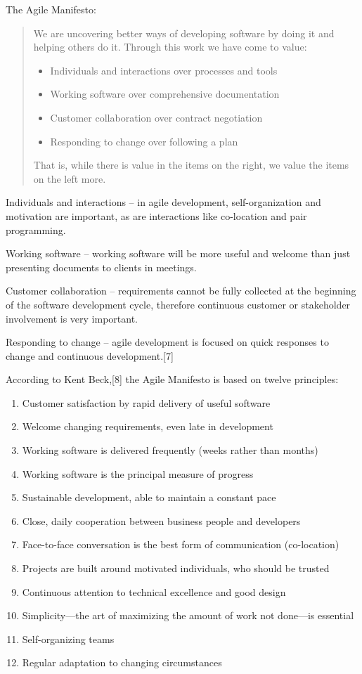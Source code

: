 The Agile Manifesto:
\begin{quotation}
\begin{small}

We are uncovering better ways of developing software by doing it and helping others do it. Through this work we have come to value:

\begin{itemize}
\item Individuals and interactions over processes and tools
\item Working software over comprehensive documentation
\item Customer collaboration over contract negotiation
\item Responding to change over following a plan
\end{itemize}

That is, while there is value in the items on the right, we value the items on the left more.
\end{small}
\end{quotation}

Individuals and interactions – in agile development, self-organization and motivation are important, as are interactions like co-location and pair programming.

Working software – working software will be more useful and welcome than just presenting documents to clients in meetings.

Customer collaboration – requirements cannot be fully collected at the beginning of the software development cycle, therefore continuous customer or stakeholder involvement is very important.

Responding to change – agile development is focused on quick responses to change and continuous development.[7]

According to Kent Beck,[8] the Agile Manifesto is based on twelve principles:
\begin{enumerate}
\item Customer satisfaction by rapid delivery of useful software
\item Welcome changing requirements, even late in development
\item Working software is delivered frequently (weeks rather than months)
\item Working software is the principal measure of progress
\item Sustainable development, able to maintain a constant pace
\item Close, daily cooperation between business people and developers
\item Face-to-face conversation is the best form of communication (co-location)
\item Projects are built around motivated individuals, who should be trusted
\item Continuous attention to technical excellence and good design
\item Simplicity—the art of maximizing the amount of work not done—is essential
\item Self-organizing teams
\item Regular adaptation to changing circumstances
\end{enumerate}

